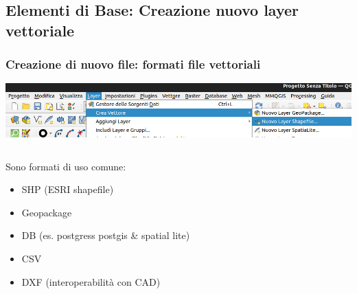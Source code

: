 \documentclass{beamer}
\begin{document}
{\subsection{Elementi di Base: Creazione nuovo layer vettoriale}

\begin{frame}
    \frametitle{Creazione di nuovo file: formati file vettoriali}
    \begin{center}
        \includegraphics[width=1\textwidth]{corso2023/editor.png}
    \end{center}
    
    \begin{columns}
        \begin{column}{0.5\textwidth}
            Sono formati di uso comune:
            \begin{itemize}
                \item SHP (ESRI shapefile)
                \item Geopackage
                \item DB (es. postgress postgis \& spatial lite)
                \item CSV
                \item DXF (interoperabilità con CAD)
            \end{itemize}
        \end{column}
    \end{columns}
\end{frame}

}
\end{document}
